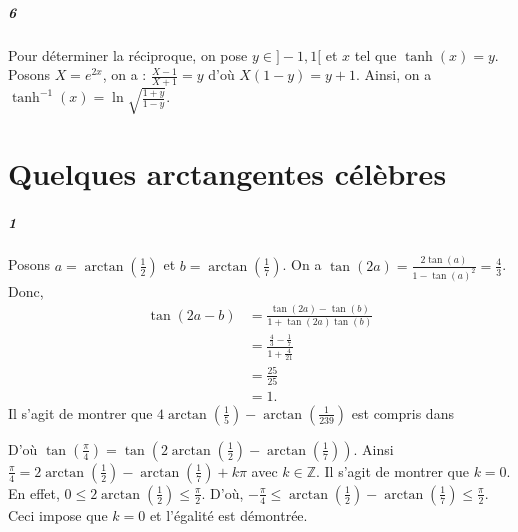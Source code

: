 \documentclass[10pt,a4paper]{article}
\begin{document}
\subparagraph{6}Pour déterminer la réciproque, on pose $y \in ]-1,1[$ et $x$ tel que $\tanh(x) = y$. Posons $X = e^{2x}$, on a : $\frac{X-1}{X+1} = y$ d'où $X(1-y) = y+1$. Ainsi, on a ${\tanh^{-1}(x) = \ln \sqrt{\frac{1+y}{1-y}}}$.

\section{Quelques arctangentes célèbres}

\subparagraph{1}Posons $a = \arctan \left( \frac{1}{2} \right)$ et $b = \arctan\left( \frac{1}{7}\right)$. On a $\tan(2a) = \frac{2\tan(a)}{1-\tan(a)^2} = \frac{4}{3}$. Donc,
\begin{equation}
\begin{aligned}
\tan\left( 2a - b \right)& = \frac{\tan(2a)- \tan(b)}{1+ \tan(2a)\tan(b)} \\
&= \frac{\frac{4}{3}-\frac{1}{7}}{1+ \frac{4}{21}} \\
&= \frac{25}{25} \\
&=1.
\end{aligned}
\end{equation}
Il s'agit de montrer que $4\arctan(\frac{1}{5}) - \arctan(\frac{1}{239})$ est compris dans 

D'où $\tan \left( \frac{\pi}{4}\right) = \tan\left( 2\arctan \left( \frac{1}{2} \right) - \arctan\left( \frac{1}{7} \right)\right)$. Ainsi $\frac{\pi}{4} = 2\arctan \left( \frac{1}{2} \right) - \arctan\left( \frac{1}{7} \right) + k \pi$ avec $k \in \mathbb{Z}$. Il s'agit de montrer que $k = 0$. En effet, $0 \le 2 \arctan \left( \frac{1}{2}\right) \le \frac{\pi}{2}$. D'où, $-\frac{\pi}{4} \le \arctan \left( \frac{1}{2} \right) - \arctan\left( \frac{1}{7} \right) \le \frac{\pi}{2}$. Ceci impose que $k=0$ et l'égalité est démontrée.
\end{document}
